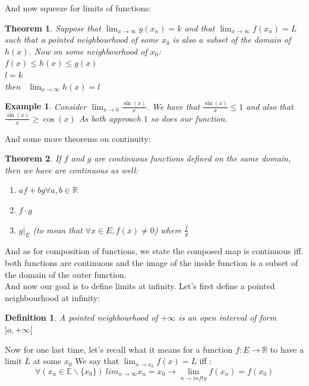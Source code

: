 \documentclass[titlepage]{article}
\newtheorem{theorem}{Theorem}[section]
\newtheorem{definition}{Definition}
\numberwithin{equation}{subsection}
\newtheorem{example}{Example}[section]
\begin{document}
And now squeeze for limits of functions:

\begin{theorem}
Suppose that $\lim_{x \to \infty} g(x_{n}) = k$ and that $\lim_{x \to \infty} f(x_{n}) = L$ such that a pointed neighbourhood of some $x_{0}$ is also a subset of the domain of $h(x)$. Now on some neighbourhood of $x_{0}$:
\\
$f(x) \leq h(x) \leq g(x)$\\
$l = k$
\\
then \ $\lim_{x \to \infty}h(x) = l$
\end{theorem}

\begin{example}
Consider $\lim_{x \to 0} \frac{\sin(x)}{x}$. We have that $\frac{\sin(x)}{x} \leq 1$ and also that $\frac{\sin(x)}{x}\geq \cos(x)$ As both approach $1$ so does our function. 
\end{example}

And some more theorems on continuity:
\begin{theorem}
If $f$ and $g$ are continuous functions defined on the same domain, then we have are continuous as well:
\begin{enumerate}
    \item $af + bg \forall a,b \in \mathbb{R}$
    \item $f\cdot g$
    \item $g|_{E}$ (to mean that $\forall x \in E, f(x) \not = 0$) where $\frac{f}{g}$
\end{enumerate}
\end{theorem}

And as for composition of functions, we state the composed map is continuous iff. both functions are continuous and the image of the inside function is a subset of the domain of the outer function.
\\

And now our goal is to define limits at infinity. Let's first define a pointed neighbourhood at infinity:

\begin{definition}
A pointed neighbourhood of $+\infty$ is an open interval of form $]a,+\infty[$
\end{definition}

Now for one last time, let's recall what it means for a function $f:E \to \mathbb{R}$ to have a limit $L$ at some $x_{0}$ We say that $\lim_{x\to x_{0}} f(x) = L$ iff :
$$ \forall (x_{n} \in \mathbb{E}\backslash\{x_{0}\}) \ lim_{n \to \infty}x_{n} = x_{0} \rightarrow \lim_{n \to infty} f(x_{n}) = f(x_{0})$$
\end{document}
